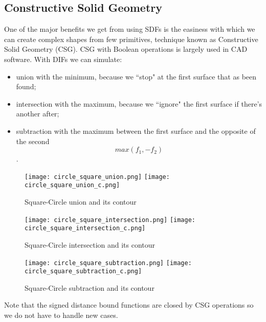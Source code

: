 \subsection{Constructive Solid Geometry}
One of the major benefits we get from using SDFs is the easiness with which we can create complex shapes from few primitives, technique known as Constructive Solid Geometry (CSG).
CSG with Boolean operations is largely used in CAD software.
With DIFs we can simulate:
\begin{itemize}
  \item union with the minimum, because we ``stop" at the first surface that as been found;
  \item intersection with the maximum, because we ``ignore" the first surface if there's another after;
  \item subtraction with the maximum between the first surface and the opposite of the second
    $$ max(f_1, -f_2) $$.
\end{itemize}

\begin{figure}[!htb]
  \texttt{[image: circle\_square\_union.png]}
  \texttt{[image: circle\_square\_union\_c.png]}
  \caption{Square-Circle union and its contour}\label{fig:union}
\endminipage\hfill
{}
  \texttt{[image: circle\_square\_intersection.png]}
  \texttt{[image: circle\_square\_intersection\_c.png]}
  \caption{Square-Circle intersection and its contour}
  \label{fig:intersection}
\endminipage\hfill
{}%
  \texttt{[image: circle\_square\_subtraction.png]}
  \texttt{[image: circle\_square\_subtraction\_c.png]}
  \caption{Square-Circle subtraction and its contour}
  \label{fig:subtraction}
\endminipage
\end{figure}
Note that the signed distance bound functions are closed by CSG operations so we do not have to handle new cases.

